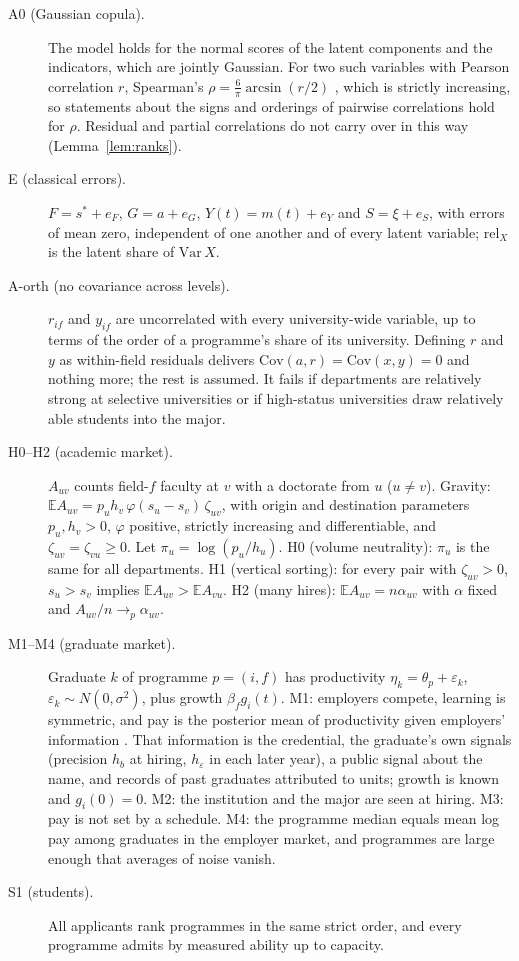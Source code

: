 \documentclass[11pt]{article}
\begin{document}
\begin{description}
\item[A0 (Gaussian copula).] The model holds for the normal scores of the latent components and the indicators,
which are jointly Gaussian. For two such variables with Pearson correlation $r$, Spearman's
$\rho=\tfrac{6}{\pi}\arcsin(r/2)$ \citep{kruskal1958ordinal}, which is strictly increasing, so statements about the
signs and orderings of pairwise correlations hold for $\rho$. Residual and partial correlations do not carry over in
this way (Lemma~\ref{lem:ranks}).
\item[E (classical errors).] $F=s^*+e_F$, $G=a+e_G$, $Y(t)=m(t)+e_Y$ and $S=\xi+e_S$, with errors of mean zero,
independent of one another and of every latent variable; $\mathrm{rel}_X$ is the latent share of $\mathrm{Var}\,X$.
\item[A-orth (no covariance across levels).] $r_{if}$ and $y_{if}$ are uncorrelated with every university-wide
variable, up to terms of the order of a programme's share of its university. Defining $r$ and $y$ as within-field
residuals delivers $\mathrm{Cov}(a,r)=\mathrm{Cov}(x,y)=0$ and nothing more; the rest is assumed. It fails if
departments are relatively strong at selective universities or if high-status universities draw relatively able
students into the major.
\item[H0--H2 (academic market).] $A_{uv}$ counts field-$f$ faculty at $v$ with a doctorate from $u$ ($u\neq v$).
Gravity: $\mathbb EA_{uv}=p_uh_v\,\varphi(s_u-s_v)\,\zeta_{uv}$, with origin and destination parameters $p_u,h_v>0$,
$\varphi$ positive, strictly increasing and differentiable, and $\zeta_{uv}=\zeta_{vu}\ge0$. Let
$\pi_u=\log(p_u/h_u)$. H0 (volume neutrality): $\pi_u$ is the same for all departments. H1 (vertical sorting): for
every pair with $\zeta_{uv}>0$, $s_u>s_v$ implies $\mathbb EA_{uv}>\mathbb EA_{vu}$. H2 (many hires):
$\mathbb EA_{uv}=n\alpha_{uv}$ with $\alpha$ fixed and $A_{uv}/n\to_p\alpha_{uv}$.
\item[M1--M4 (graduate market).] Graduate $k$ of programme $p=(i,f)$ has productivity
$\eta_k=\theta_p+\varepsilon_k$, $\varepsilon_k\sim N(0,\sigma^2)$, plus growth $\beta_fg_i(t)$. M1: employers
compete, learning is symmetric, and pay is the posterior mean of productivity given employers' information
\citep{farber1996learning}. That information is the credential, the graduate's own signals (precision $h_b$ at
hiring, $h_\varepsilon$ in each later year), a public signal about the name, and records of past graduates
attributed to units; growth is known and $g_i(0)=0$. M2: the
institution and the major are seen at hiring. M3: pay is not set by a schedule. M4: the programme median equals mean
log pay among graduates in the employer market, and programmes are large enough that averages of noise vanish.
\item[S1 (students).] All applicants rank programmes in the same strict order, and every programme admits by
measured ability up to capacity.
\end{description}
\end{document}

